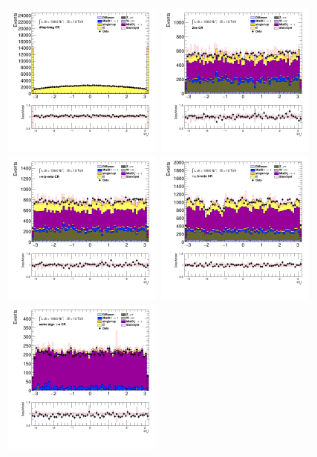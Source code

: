 		\begin{figure}[!htp]
			\begin{center}    
			\includegraphics[width=0.35\textwidth]{chapters/chapter6_HPlus/images/taulep/lep_0_phi_DILEP_BTAG.png}
			\includegraphics[width=0.35\textwidth]{chapters/chapter6_HPlus/images/taulep/lep_0_phi_ZEE.png} \\
			\includegraphics[width=0.35\textwidth]{chapters/chapter6_HPlus/images/taulep/lep_0_phi_TAUEL_BVETO.png} 
			\includegraphics[width=0.35\textwidth]{chapters/chapter6_HPlus/images/taulep/lep_0_phi_TAUMU_BVETO.png} \\
			\includegraphics[width=0.35\textwidth]{chapters/chapter6_HPlus/images/taulep/lep_0_phi_SS_TAUEL.png} 

\end{center}
\end{figure}
